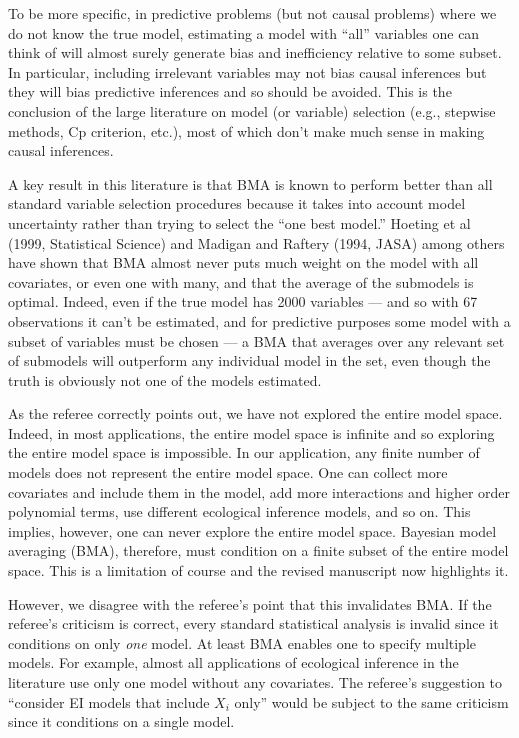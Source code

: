 \documentclass[11pt]{article}
\begin{document}
\begin{enumerate}
  To be more specific, in predictive problems (but not causal
  problems) where we do not know the true model, estimating a model
  with ``all'' variables one can think of will almost surely generate
  bias and inefficiency relative to some subset.  In particular,
  including irrelevant variables may not bias causal inferences but
  they will bias predictive inferences and so should be avoided.  This
  is the conclusion of the large literature on model (or variable)
  selection (e.g., stepwise methods, Cp criterion, etc.), most of
  which don't make much sense in making causal inferences.
  
  A key result in this literature is that BMA is known to perform
  better than all standard variable selection procedures because it
  takes into account model uncertainty rather than trying to select
  the ``one best model.''  Hoeting et al (1999, Statistical Science)
  and Madigan and Raftery (1994, JASA) among others have shown that
  BMA almost never puts much weight on the model with all covariates,
  or even one with many, and that the average of the submodels is
  optimal.  Indeed, even if the true model has 2000 variables --- and
  so with 67 observations it can't be estimated, and for predictive
  purposes some model with a subset of variables must be chosen --- a
  BMA that averages over any relevant set of submodels will outperform
  any individual model in the set, even though the truth is obviously
  not one of the models estimated.
  
  As the referee correctly points out, we have not explored the entire
  model space. Indeed, in most applications, the entire model space is
  infinite and so exploring the entire model space is impossible.  In
  our application, any finite number of models does not represent the
  entire model space.  One can collect more covariates and include
  them in the model, add more interactions and higher order polynomial
  terms, use different ecological inference models, and so on.  This
  implies, however, one can never explore the entire model space.
  Bayesian model averaging (BMA), therefore, must condition on a
  finite subset of the entire model space.  This is a limitation of
  course and the revised manuscript now highlights it.
  
  However, we disagree with the referee's point that this invalidates
  BMA.  If the referee's criticism is correct, every standard
  statistical analysis is invalid since it conditions on only
  \emph{one} model.  At least BMA enables one to specify multiple
  models.  For example, almost all applications of ecological
  inference in the literature use only one model without any
  covariates.  The referee's suggestion to ``consider EI models that
  include $X_i$ only'' would be subject to the same criticism since it
  conditions on a single model.
  

\end{enumerate}
\end{document}
